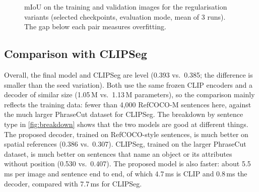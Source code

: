 \documentclass[conference,a4paper]{IEEEtran}
\begin{document}
\begin{figure}[!htbp]
\centering
{}
\caption{mIoU on the training and validation images for the regularisation variants (selected
checkpoints, evaluation mode, mean of 3 runs). The gap below each pair measures overfitting.}
\label{fig:gap}
\end{figure}

\subsection{Comparison with CLIPSeg}

Overall, the final model and CLIPSeg are level (0.393 vs.\ 0.385; the difference is smaller than
the seed variation). Both use the same frozen CLIP encoders and a decoder of similar size (1.05\,M
vs.\ 1.13\,M parameters), so the comparison mainly reflects the training data: fewer than 4,000
RefCOCO-M sentences here, against the much larger PhraseCut dataset for CLIPSeg. The breakdown by sentence type in \cref{fig:breakdown} shows that the two
models are good at different things. The proposed decoder, trained on RefCOCO-style sentences, is much better
on spatial references (0.386 vs.\ 0.307). CLIPSeg, trained on the larger PhraseCut dataset, is much
better on sentences that name an object or its attributes without position (0.530 vs.\ 0.407). The
proposed model is also faster: about 5.5\,ms per image and sentence end to end, of which 4.7\,ms is CLIP and
0.8\,ms the decoder, compared with 7.7\,ms for CLIPSeg.
\end{document}
